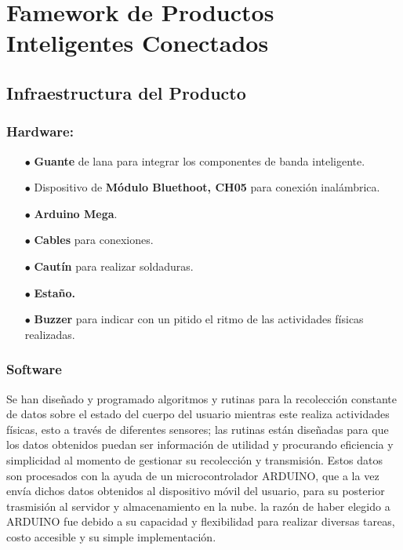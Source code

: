 \documentclass[osajnl,twocolumn,showpacs,superscriptaddress,10pt]{revtex4-1}
\begin{document}
\section{Famework de Productos Inteligentes Conectados}
\subsection{Infraestructura del Producto}
\subsubsection{Hardware:}
\begin{itemize}
    \item[$\bullet$]\textbf{Guante} de lana para integrar los componentes de banda inteligente.
    \item[$\bullet$]Dispositivo de \textbf{Módulo Bluethoot, CH05} para conexión inalámbrica.
    \item[$\bullet$]\textbf{Arduino Mega}.
    \item[$\bullet$]\textbf{Cables} para conexiones.
    \item[$\bullet$]\textbf{Cautín} para realizar soldaduras.
    \item[$\bullet$]\textbf{Estaño.}
    \item[$\bullet$]\textbf{Buzzer} para indicar con un pitido el ritmo de las actividades físicas realizadas.
\end{itemize}
\subsubsection{Software}
    Se han diseñado y programado algoritmos y rutinas para la recolección constante de datos sobre el estado del cuerpo del usuario mientras este realiza actividades físicas, esto a través de diferentes sensores; las rutinas están diseñadas para que los datos obtenidos puedan ser información de utilidad y procurando eficiencia y simplicidad al momento de gestionar su recolección y transmisión. Estos datos son procesados con la ayuda de un microcontrolador ARDUINO, que a la vez envía dichos datos obtenidos al dispositivo móvil del usuario, para su posterior trasmisión al servidor y almacenamiento en la nube. la razón de haber elegido a ARDUINO fue debido a su capacidad y flexibilidad para realizar diversas tareas, costo accesible y su simple implementación.
    
\end{document}
